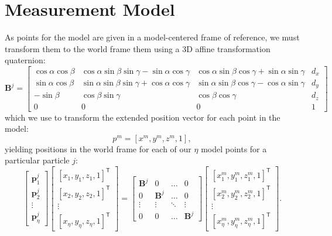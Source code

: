 \section{Measurement Model}
As points for the model are given in a model-centered frame of reference, we must transform them to the world frame them using a 3D affine transformation quaternion:
\begin{equation} \mathbf{B}^j = 
\begin{bmatrix}
 \cos{\alpha}\cos{\beta} & \cos{\alpha}\sin{\beta}\sin{\gamma} - \sin{\alpha}\cos{\gamma} & \cos{\alpha}\sin{\beta}\cos{\gamma} + \sin{\alpha}\sin{\gamma}  & d_x \\ 
\sin{\alpha}\cos{\beta} & \sin{\alpha}\sin{\beta}\sin{\gamma} + \cos{\alpha}\cos{\gamma} & \sin{\alpha}\sin{\beta}\cos{\gamma} - \cos{\alpha}\sin{\gamma}  & d_y \\ 
 -\sin{\beta} & \cos{\beta}\sin{\gamma} & \cos{\beta}\cos{\gamma} & d_z \\ 
 0 & 0 & 0 & 1
\end{bmatrix} \end{equation}
 which we use to transform the extended position vector for each point in the model:
\begin{equation} 
  p^m = [x^m,y^m,z^m,1],
\end{equation}
 yielding positions in the world frame for each of our $\eta$ model points for a particular particle $j$:
\begin{equation} 
  \begin{bmatrix}
    \mathbf{p}^j_1 \\
    \mathbf{p}^j_2 \\
    \vdots \\
    \mathbf{p}^j_\eta
  \end{bmatrix}
  \begin{bmatrix}
    [x_1,y_1,z_1,1]^\mathsf{T} \\
    [x_2,y_2,z_2,1]^\mathsf{T} \\
    \vdots    \\
    [x_\eta,y_\eta,z_\eta,1]^\mathsf{T}
  \end{bmatrix}
  =
  \begin{bmatrix} 
    \mathbf{B}^j & 0 & \ldots & 0 \\
    0 & \mathbf{B}^j & \ldots &  0 \\
    \vdots & \vdots & \ddots & \vdots \\
    0 & 0 & \ldots & \mathbf{B}^j 
  \end{bmatrix} 
  \begin{bmatrix}
    [x^m_1,y^m_1,z^m_1,1]^\mathsf{T} \\
    [x^m_2,y^m_2,z^m_2,1]^\mathsf{T} \\
    \vdots    \\
    [x^m_\eta,y^m_\eta,z^m_\eta,1]^\mathsf{T}
  \end{bmatrix}.
\end{equation}

